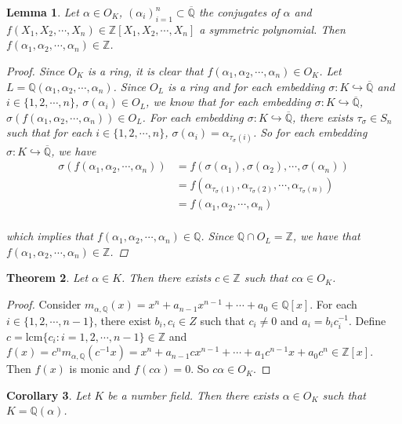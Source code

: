 \documentclass[12pt]{amsart}
\newtheorem{thm}{Theorem}[subsection]
\newtheorem{lem}[thm]{Lemma}
\newtheorem{cor}[thm]{Corollary}
\theoremstyle{definition}
\theoremstyle{remark}
\theoremstyle{definition}
\newcommand{\al}{\alpha}
\newcommand{\sig}{\sigma}
\newcommand{\Z}{\mathbb{Z}}
\newcommand{\Q}{\mathbb{Q}}
\begin{document}
\begin{lem}
Let $\al \in O_K$, $(\al_i)_{i=1}^n \subset \overline{\Q}$ the conjugates of $\al$ and $f(X_1, X_2,\cdots, X_n) \in \Z[X_1, X_2,\cdots, X_n]$ a symmetric polynomial. Then $f(\al_1, \al_2, \cdots, \al_n) \in \Z$.

\begin{proof}
Since $O_K$ is a ring, it is clear that $f(\al_1, \al_2, \cdots, \al_n) \in O_K$. Let $L = \Q(\al_1, \al_2, \cdots, \al_n)$. Since $O_L$ is a ring and for each embedding $\sig : K \hookrightarrow \overline{\Q}$ and $i \in \{1,2,\cdots,n\}$, $\sig(\al_i) \in O_L$, we know that for each embedding $\sig : K \hookrightarrow \overline{\Q}$, $\sig(f(\al_1, \al_2, \cdots, \al_n)) \in O_L$. For each embedding $\sig : K \hookrightarrow \overline{\Q}$, there exists $\tau_\sig \in S_n$ such that for each $i \in \{1,2,\cdots, n\}$, $\sig(\al_i) = \al_{\tau_{\sig}(i)}$. So for each embedding $\sig : K \hookrightarrow \overline{\Q}$, we have
\begin{align*}
\sig(f(\al_1, \al_2, \cdots, \al_n))
&= f(\sig(\al_1),\sig(\al_2), \cdots, \sig(\al_n)) \\
&= f(\al_{\tau_{\sig}(1)}, \al_{\tau_{\sig}(2)},\cdots, \al_{\tau_{\sig}(n)})\\
&= f(\al_1, \al_2, \cdots, \al_n) \\
\end{align*}

which implies that $f(\al_1, \al_2, \cdots, \al_n) \in \Q$. Since $\Q \cap O_L = \Z$, we have that $f(\al_1, \al_2, \cdots, \al_n) \in \Z$.
\end{proof}
\end{lem}

\begin{thm}
Let $\al \in K$. Then there exists $c \in \Z$ such that $c\al \in O_K$.
\end{thm}

\begin{proof}
Consider $m_{\al, \Q}(x) = x^n + a_{n-1}x^{n-1} + \cdots + a_0 \in \Q[x]$. For each $i \in \{1,2,\cdots,n-1\}$, there exist $b_i, c_i \in Z$ such that $c_i \neq 0$ and $a_i=b_ic_i^{-1}$. Define $c = \text{lcm} \{c_i:i=1,2,\cdots,n-1\} \in \Z$ and $f(x) = c^nm_{\al,\Q}(c^{-1}x) = x^n + a_{n-1}cx^{n-1} + \cdots+ a_1c^{n-1}x + a_0c^n \in \Z[x]$. Then $f(x)$ is monic and $f(c\al) =0$. So $c \al \in O_K$. 
\end{proof}

\begin{cor}
Let $K$ be a number field. Then there exists $\al \in O_K$ such that $K=\Q(\al)$. 
\end{cor}
\end{document}
